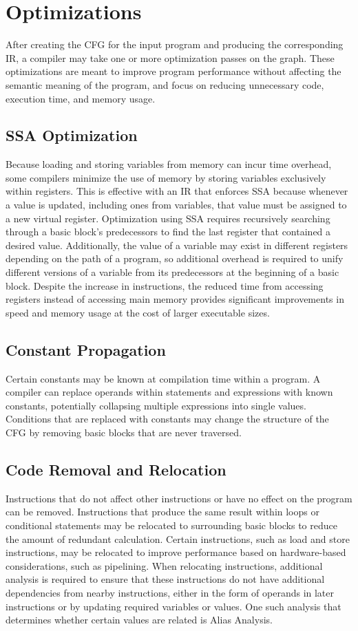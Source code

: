 {\section{Optimizations}
After creating the CFG for the input program and producing the corresponding IR, a compiler may take one or more optimization passes on the graph. These optimizations are meant to improve program performance without affecting the semantic meaning of the program, and focus on reducing unnecessary code, execution time, and memory usage.

\subsection{SSA Optimization}
Because loading and storing variables from memory can incur time overhead, some compilers minimize the use of memory by storing variables exclusively within registers. This is effective with an IR that enforces SSA because whenever a value is updated, including ones from variables, that value must be assigned to a new virtual register. Optimization using SSA requires recursively searching through a basic block's predecessors to find the last register that contained a desired value. Additionally, the value of a variable may exist in different registers depending on the path of a program, so additional overhead is required to unify different versions of a variable from its predecessors at the beginning of a basic block. Despite the increase in instructions, the reduced time from accessing registers instead of accessing main memory provides significant improvements in speed and memory usage at the cost of larger executable sizes.

\subsection{Constant Propagation}
Certain constants may be known at compilation time within a program. A compiler can replace operands within statements and expressions with known constants, potentially collapsing multiple expressions into single values. Conditions that are replaced with constants may change the structure of the CFG by removing basic blocks that are never traversed.

\subsection{Code Removal and Relocation}
Instructions that do not affect other instructions or have no effect on the program can be removed. Instructions that produce the same result within loops or conditional statements may be relocated to surrounding basic blocks to reduce the amount of redundant calculation. Certain instructions, such as load and store instructions, may be relocated to improve performance based on hardware-based considerations, such as pipelining. When relocating instructions, additional analysis is required to ensure that these instructions do not have additional dependencies from nearby instructions, either in the form of operands in later instructions or by updating required variables or values. One such analysis that determines whether certain values are related is Alias Analysis.

}
